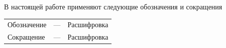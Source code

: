 
В настоящей работе применяют следующие обозначения и сокращения

\begin{tabular}{p{2cm}p{0.5 cm}p{10cm}}
    Обозначение & --- & Расшифровка\\
    Сокращение  & --- & Расшифровка\\
\end{tabular}

